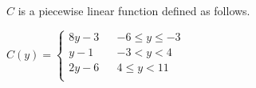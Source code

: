 \documentclass{ximera}
\begin{document}
\begin{definition}
$C$ is a piecewise linear function defined as follows.

$C(y) =   
\left \{ \begin{aligned}     
8 y - 3 && -6 \leq y \leq -3 \\        
y - 1 && -3 < y < 4 \\      
2 y -6 && 4 \leq y < 11\\       
\end{aligned} \right .$ 


\end{definition}
\end{document}
